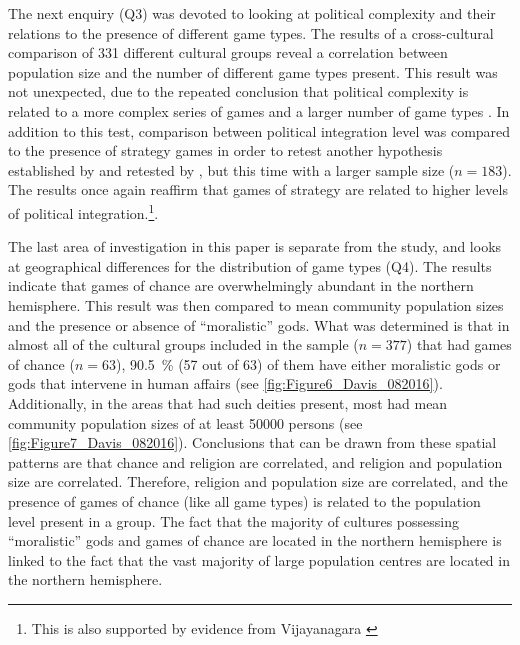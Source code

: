 \documentclass[%
	]{ijsra}
\begin{document}
The next enquiry (Q3) was devoted to looking at political complexity and their relations to the presence of different game types. The results of a cross-cultural comparison of 331 different cultural groups reveal a correlation between population size and the number of different game types present. This result was not unexpected, due to the repeated conclusion that political complexity is related to a more complex series of games and a larger number of game types \parencites[291]{ball1972}[322]{chick1984}[195]{chick1998}{chick2015}{peregrine2008}{roberts1959}. In addition to this test, comparison between political integration level was compared to the presence of strategy games in order to retest another hypothesis established by \textcite{roberts1959} and retested by \textcite{chick1998}, but this time with a larger sample size ($n = 183$). The results once again reaffirm that games of strategy are related to higher levels of political integration.\footnote{This is also supported by evidence from Vijayanagara \parencite{rogersdotter2015}}.

The last area of investigation in this paper is separate from the \textcite{roberts1959} study, and looks at geographical differences for the distribution of game types (Q4). The results indicate that games of chance are overwhelmingly abundant in the northern hemisphere. This result was then compared to mean community population sizes and the presence or absence of ``moralistic” gods. What was determined is that in almost all of the cultural groups included in the sample ($n = 377$) that had games of chance ($n = 63$), \SI{90.5}{\percent} (57 out of 63) of them have either moralistic gods or gods that intervene in human affairs (see \cref{fig:Figure6_Davis_082016}). Additionally, in the areas that had such deities present, most had mean community population sizes of at least \num{50000} persons (see \cref{fig:Figure7_Davis_082016}). 
Conclusions that can be drawn from these spatial patterns are that chance and religion are correlated, and religion and population size are correlated. Therefore, religion and population size are correlated, and the presence of games of chance (like all game types) is related to the population level present in a group. 
The fact that the majority of cultures possessing ``moralistic” gods and games of chance are located in the northern hemisphere is linked to the fact that the vast majority of large population centres are located in the northern hemisphere.
\end{document}
